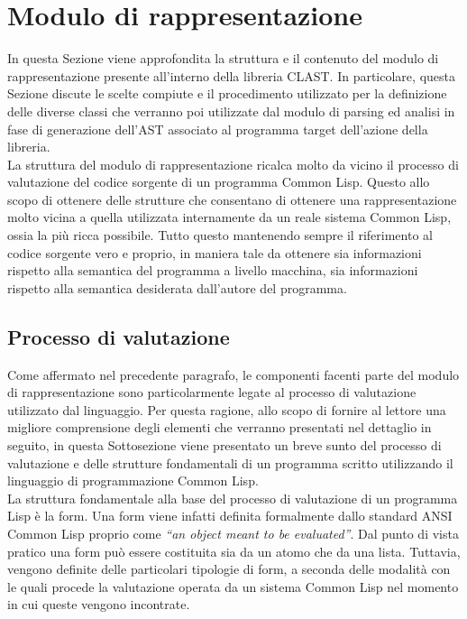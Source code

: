 \section{Modulo di rappresentazione}
\label{representation}

In questa Sezione viene approfondita la struttura e il contenuto del modulo di
rappresentazione presente all'interno della libreria CLAST. In particolare,
questa Sezione discute le scelte compiute e il procedimento utilizzato per la
definizione delle diverse classi che verranno poi utilizzate dal modulo di
parsing ed analisi in fase di generazione dell'AST associato al programma
target dell'azione della libreria.\\

La struttura del modulo di rappresentazione ricalca molto da vicino il
processo di valutazione del codice sorgente di un programma Common Lisp.
Questo allo scopo di ottenere delle strutture che consentano di ottenere una
rappresentazione molto vicina a quella utilizzata internamente da un reale
sistema Common Lisp, ossia la più ricca possibile. Tutto questo mantenendo
sempre il riferimento al codice sorgente vero e proprio, in maniera tale da
ottenere sia informazioni rispetto alla semantica del programma a livello
macchina, sia informazioni rispetto alla semantica desiderata dall’autore del
programma.

\subsection{Processo di valutazione}
\label{CL-valutazione}

Come affermato nel precedente paragrafo, le componenti facenti parte del
modulo di rappresentazione sono particolarmente legate al processo di
valutazione utilizzato dal linguaggio. Per questa ragione, allo scopo di
fornire al lettore una migliore comprensione degli elementi che verranno
presentati nel dettaglio in seguito, in questa Sottosezione viene presentato
un breve sunto del processo di valutazione e delle strutture fondamentali di
un programma scritto utilizzando il linguaggio di programmazione Common
Lisp.\\

La struttura fondamentale alla base del processo di valutazione di un
programma Lisp è la form. Una form viene infatti definita formalmente dallo
standard ANSI Common Lisp proprio come \textit{“an object meant to be
evaluated”}. Dal punto di vista pratico una form può essere costituita sia da
un atomo che da una lista. Tuttavia, vengono definite delle particolari
tipologie di form, a seconda delle modalità con le quali procede la
valutazione operata da un sistema Common Lisp nel momento in cui queste
vengono incontrate.

